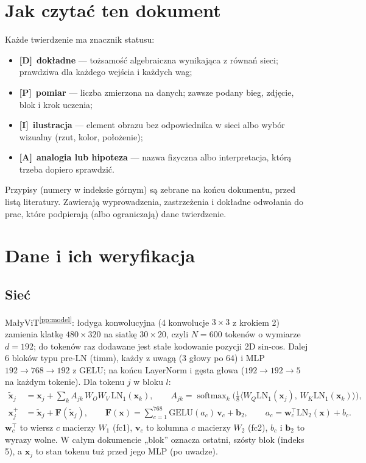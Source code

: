 \documentclass[a4paper,11pt]{article}
\newcommand{\stD}{\textcolor{dok}{\textsf{\textbf{[D]}}}}
\newcommand{\stP}{\textcolor{pom}{\textsf{\textbf{[P]}}}}
\newcommand{\stI}{\textcolor{ilu}{\textsf{\textbf{[I]}}}}
\newcommand{\stA}{\textcolor{ana}{\textsf{\textbf{[A]}}}}
\newcommand{\LN}{\mathrm{LN}}
\newcommand{\GELU}{\mathrm{GELU}}
\newcommand{\pp}[1]{\textsuperscript{\ref{pp:#1}}}
\begin{document}
\section*{Jak czytać ten dokument}
Każde twierdzenie ma znacznik statusu:
\begin{itemize}
\item \stD\ \textbf{dokładne} --- tożsamość algebraiczna wynikająca z równań sieci; prawdziwa dla każdego wejścia i każdych wag;
\item \stP\ \textbf{pomiar} --- liczba zmierzona na danych; zawsze podany bieg, zdjęcie, blok i krok uczenia;
\item \stI\ \textbf{ilustracja} --- element obrazu bez odpowiednika w sieci albo wybór wizualny (rzut, kolor, położenie);
\item \stA\ \textbf{analogia lub hipoteza} --- nazwa fizyczna albo interpretacja, którą trzeba dopiero sprawdzić.
\end{itemize}
Przypisy (numery w indeksie górnym) są zebrane na końcu dokumentu, przed listą literatury. Zawierają wyprowadzenia, zastrzeżenia
i dokładne odwołania do prac, które podpierają (albo ograniczają) dane twierdzenie.

\section{Dane i ich weryfikacja}

\subsection{Sieć}
MałyViT\pp{model}: łodyga konwolucyjna (4 konwolucje $3\times3$ z krokiem 2) zamienia klatkę $480\times320$ na siatkę $30\times20$,
czyli $N=600$ tokenów o wymiarze $d=192$; do tokenów raz dodawane jest stałe kodowanie pozycji 2D sin-cos. Dalej 6 bloków typu pre-LN
(timm), każdy z uwagą (3 głowy po 64) i MLP $192\to768\to192$ z GELU; na końcu LayerNorm i gęsta głowa ($192\to192\to5$ na każdym tokenie).
Dla tokenu $j$ w bloku $l$:
\begin{align}
\tilde{\bm x}_j &= \bm x_j + \sum_{k} A_{jk}\, W_O W_V\, \LN_1(\bm x_k), \qquad
A_{jk}=\operatorname{softmax}_k\!\Big(\tfrac{1}{8}\big\langle W_Q\LN_1(\bm x_j),\,W_K\LN_1(\bm x_k)\big\rangle\Big), \label{eq:uwaga}\\
\bm x_j^{+} &= \tilde{\bm x}_j + \bm F(\tilde{\bm x}_j), \qquad
\bm F(\bm x) = \sum_{c=1}^{768} \GELU(a_c)\, \bm v_c + \bm b_2, \qquad a_c=\bm w_c^{\!\top}\LN_2(\bm x)+b_c. \label{eq:mlp}
\end{align}
$\bm w_c^{\!\top}$ to wiersz $c$ macierzy $W_1$ (fc1), $\bm v_c$ to kolumna $c$ macierzy $W_2$ (fc2), $b_c$ i $\bm b_2$ to wyrazy wolne.
W całym dokumencie „blok” oznacza ostatni, szósty blok (indeks 5), a $\bm x_j$ to stan tokenu tuż przed jego MLP (po uwadze).
\end{document}
